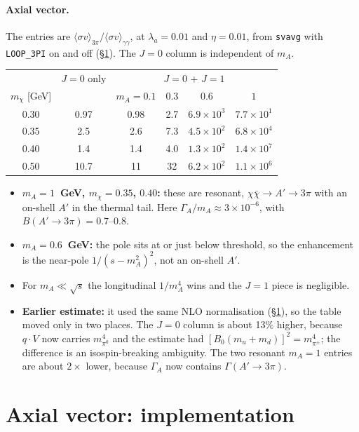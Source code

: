 \documentclass{article}
\begin{document}
\paragraph{Axial vector.}
The entries are $\langle\sigma v\rangle_{3\pi}/\langle\sigma v\rangle_{\gamma\gamma}$, at
$\lambda_a=0.01$ and $\eta=0.01$, from \texttt{svavg} with \texttt{LOOP\_3PI} on and off
(\S\ref{sec:impl}). The $J=0$ column is independent of $m_A$.
\begin{center}
\begin{tabular}{c|c|cccc}
\toprule
 & $J=0$ only & \multicolumn{4}{c}{$J=0$ + $J=1$}\\
$m_\chi$ [GeV] & & $m_A=0.1$ & $0.3$ & $0.6$ & $1$\\
\midrule
0.30 & 0.97 & 0.98 & 2.7 & $6.9\times10^3$ & $7.7\times10^1$\\
0.35 & 2.5  & 2.6  & 7.3 & $4.5\times10^2$ & $6.8\times10^4$\\
0.40 & 1.4  & 1.4  & 4.0 & $1.3\times10^2$ & $1.4\times10^7$\\
0.50 & 10.7 & 11   & 32  & $6.2\times10^2$ & $1.1\times10^6$\\
\bottomrule
\end{tabular}
\end{center}
\begin{itemize}
\item \textbf{$m_A=1$~GeV, $m_\chi=0.35$, $0.40$:} these are resonant, $\chi\bar\chi\to A'\to3\pi$
  with an on-shell $A'$ in the thermal tail. Here $\Gamma_A/m_A\approx3\times10^{-6}$, with
  $B(A'\to3\pi)=0.7$--$0.8$.
\item \textbf{$m_A=0.6$~GeV:} the pole sits at or just below threshold, so the enhancement is the
  near-pole $1/(s-m_A^2)^2$, not an on-shell $A'$.
\item For $m_A\ll\sqrt s$ the longitudinal $1/m_A^4$ wins and the $J=1$ piece is negligible.
\item \textbf{Earlier estimate:} it used the same NLO normalisation (\S\ref{sec:impl}), so the
  table moved only in two places. The $J=0$ column is about 13\% higher, because
  $q\cdot V$ now carries $m_{\pi^0}^4$ and the estimate had $[B_0(m_u+m_d)]^2=m_{\pi^\pm}^4$; the
  difference is an isospin-breaking ambiguity. The two resonant $m_A=1$ entries are about
  $2\times$ lower, because $\Gamma_A$ now contains $\Gamma(A'\to3\pi)$.
\end{itemize}

\section{Axial vector: implementation}
\label{sec:impl}
\end{document}
